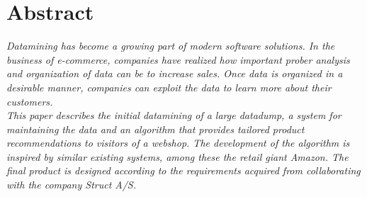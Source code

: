 \chapter{Abstract}
\textit{Datamining has become a growing part of modern software solutions. In the business of e-commerce, companies have realized how important prober analysis and organization of data can be to increase sales. Once data is organized in a desirable manner, companies can exploit the data to learn more about their customers.\\
This paper describes the initial datamining of a large datadump, a system for maintaining the data and an algorithm that provides tailored product recommendations to visitors of a webshop.
The development of the algorithm is inspired by similar existing systems, among these the retail giant Amazon. The final product is designed according to the requirements acquired from collaborating with the company Struct A/S.}